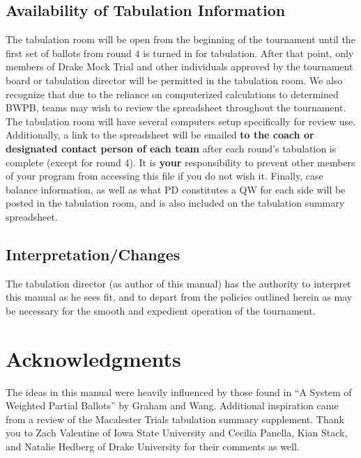 \documentclass{article}
\begin{document}
\subsection{Availability of Tabulation Information}
The tabulation room will be open from the beginning of the tournament until the first set of ballots from round $4$ is turned in for tabulation.  After that point, only members of Drake Mock Trial and other individuals approved by the tournament board or tabulation director will be permitted in the tabulation room.  We also recognize that due to the reliance on computerized calculations to determined BWPB, teams may wish to review the spreadsheet throughout the tournament.  The tabulation room will have several computers setup specifically for review use.  Additionally, a link to the spreadsheet will be emailed \textbf{to the coach or designated contact person of each team} after each round's tabulation is complete (except for round $4$).  It is \textbf{your} responsibility to prevent other members of your program from accessing this file if you do not wish it.  Finally, case balance information, as well as what PD constitutes a QW for each side will be posted in the tabulation room, and is also included on the tabulation summary spreadsheet.
\subsection{Interpretation/Changes}
The tabulation director (as author of this manual) has the authority to interpret this manual as he sees fit, and to depart from the policies outlined herein as may be necessary for the smooth and expedient operation of the tournament.
\section{Acknowledgments}
The ideas in this manual were heavily influenced by those found in ``A System of Weighted Partial Ballots'' by Graham and Wang.  Additional inspiration came from a review of the Macalester Trials tabulation summary supplement.  Thank you to Zach Valentine of Iowa State University and Cecilia Panella, Kian Stack, and Natalie Hedberg of Drake University for their comments as well.
\end{document}

